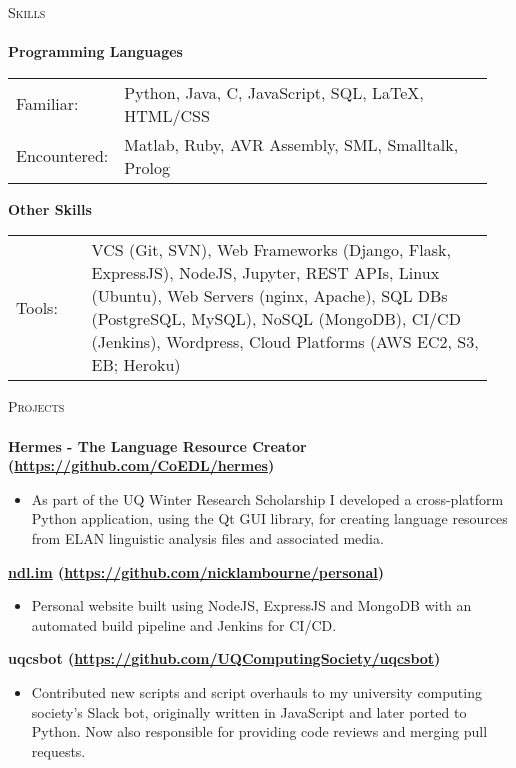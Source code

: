 \documentclass[a4paper]{article}
\newcommand{\lineunder} {
    \vspace*{-8pt} \\
    \hspace*{-10pt} \hrulefill \\
}
\newcommand{\header} [1] {
    {\hspace*{-10pt}\vspace*{6pt} \textsc{#1}}
    \vspace*{-6pt} \lineunder
}
\newenvironment{singleitem}
{   \small
    \vspace{-2.6pt}
    \begin{itemize}
    \setlength{\itemsep}{0pt}
    \setlength{\parskip}{0pt}
    \setlength{\parsep}{0pt}   }
{\end{itemize} \vspace{-2.6pt}	}
\begin{document}
\vspace{-1mm}
\header{Skills}
\textbf{Programming Languages}
\begin{tabular}{p{0.15\linewidth}p{0.80\linewidth}}
	\small Familiar: & \small Python, Java, C, JavaScript, SQL, \LaTeX, HTML/CSS \\
	\small Encountered: & \small Matlab, Ruby, AVR Assembly, SML, Smalltalk, Prolog\\
\end{tabular}
\textbf{Other Skills}
\begin{tabular}{p{0.15\linewidth}p{0.80\linewidth}}
	\small Tools: & \small VCS (Git, SVN), Web Frameworks (Django, Flask, ExpressJS), NodeJS,  Jupyter, REST APIs, Linux (Ubuntu), Web Servers (nginx, Apache), SQL DBs (PostgreSQL, MySQL), NoSQL (MongoDB), CI/CD (Jenkins), Wordpress, Cloud Platforms (AWS EC2, S3, EB; Heroku)
\end{tabular}

\vspace{0mm}

\header{Projects}

\textbf{{Hermes - The Language Resource Creator} (\href{https://github.com/CoEDL/hermes}{https://github.com/CoEDL/hermes})}
\begin{singleitem}
	\item As part of the UQ Winter Research Scholarship I developed a cross-platform Python application, using the Qt GUI library, for creating language resources from ELAN linguistic analysis files and associated media.
\end{singleitem}

\textbf{\href{https://ndl.im}{ndl.im} (\href{https://github.com/nicklambourne/personal}{https://github.com/nicklambourne/personal})}
\begin{singleitem}
	\item Personal website built using NodeJS, ExpressJS and MongoDB with an automated build pipeline and Jenkins for CI/CD.
\end{singleitem}

\textbf{uqcsbot (\href{https://github.com/UQComputingSociety/uqcsbot}{https://github.com/UQComputingSociety/uqcsbot})}
\begin{singleitem}
	\item Contributed new scripts and script overhauls to my university computing society's Slack bot, originally written in JavaScript and later ported to Python. Now also responsible for providing code reviews and merging pull requests.
\end{singleitem}
\end{document}
